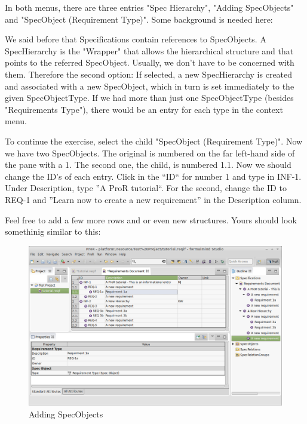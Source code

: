 In both menus, there are three entries "Spec Hierarchy", "Adding SpecObjects" and "SpecObject (Requirement Type)".  Some background is needed here:

We said before that Specifications contain references to SpecObjects.  A SpecHierarchy is the "Wrapper" that allows the hierarchical structure and that points to the referred SpecObject.  Usually, we don't have to be concerned with them.  Therefore the second option: If selected, a new SpecHierarchy is created and associated with a new SpecObject, which in turn is set immediately to the given SpecObjectType.  If we had more than just one SpecObjectType (besides "Requirements Type"), there would be an entry for each type in the context menu.

To continue the exercise, select the child "SpecObject (Requirement Type)".  Now we have two SpecObjects.  The original is numbered on the far left-hand side of the pane with a 1.  The second one, the child, is numbered 1.1.  Now we should change the ID's of each entry.  Click in the ``ID`` for number 1 and type in INF-1.  Under Description, type ''A ProR tutorial``.  For the second, change the ID to REQ-1 and ''Learn now to create a new requirement'' in the Description column.

Feel free to add a few more rows and or even new structures.  Yours should look somethinig similar to this:

\begin{figure}[h!]
\centering
\includegraphics[width=\linewidth]{../rmf-images/hierarchy_example.png}      
\caption{Adding SpecObjects}      
\label{fig:Requirements Hierarchy}
\end{figure}

